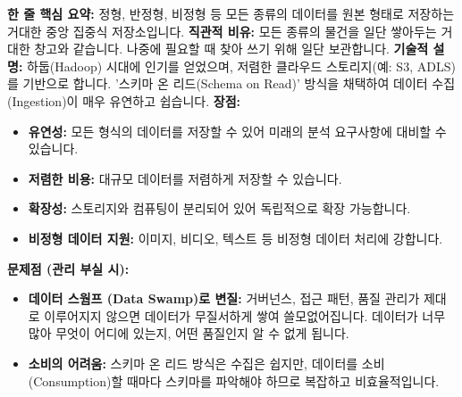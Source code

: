 \documentclass[11pt,a4paper]{article}
\theoremstyle{definition}
\begin{document}
\begin{tcolorbox}[title=\textbf{데이터 레이크 (Data Lake)}, colback=green!5!white, colframe=green!75!black, sharp corners, boxrule=0.8pt]
\textbf{한 줄 핵심 요약:} 정형, 반정형, 비정형 등 모든 종류의 데이터를 원본 형태로 저장하는 거대한 중앙 집중식 저장소입니다.
\textbf{직관적 비유:} 모든 종류의 물건을 일단 쌓아두는 거대한 창고와 같습니다. 나중에 필요할 때 찾아 쓰기 위해 일단 보관합니다.
\textbf{기술적 설명:} 하둡(Hadoop) 시대에 인기를 얻었으며, 저렴한 클라우드 스토리지(예: S3, ADLS)를 기반으로 합니다. '스키마 온 리드(Schema on Read)' 방식을 채택하여 데이터 수집(Ingestion)이 매우 유연하고 쉽습니다.
\textbf{장점:}
\begin{itemize}
    \item \textbf{유연성:} 모든 형식의 데이터를 저장할 수 있어 미래의 분석 요구사항에 대비할 수 있습니다.
    \item \textbf{저렴한 비용:} 대규모 데이터를 저렴하게 저장할 수 있습니다.
    \item \textbf{확장성:} 스토리지와 컴퓨팅이 분리되어 있어 독립적으로 확장 가능합니다.
    \item \textbf{비정형 데이터 지원:} 이미지, 비디오, 텍스트 등 비정형 데이터 처리에 강합니다.
\end{itemize}
\textbf{문제점 (관리 부실 시):}
\begin{itemize}
    \item \textbf{데이터 스웜프 (Data Swamp)로 변질:} 거버넌스, 접근 패턴, 품질 관리가 제대로 이루어지지 않으면 데이터가 무질서하게 쌓여 쓸모없어집니다. 데이터가 너무 많아 무엇이 어디에 있는지, 어떤 품질인지 알 수 없게 됩니다.
    \item \textbf{소비의 어려움:} 스키마 온 리드 방식은 수집은 쉽지만, 데이터를 소비(Consumption)할 때마다 스키마를 파악해야 하므로 복잡하고 비효율적입니다.
\end{itemize}
\end{tcolorbox}
\end{document}
